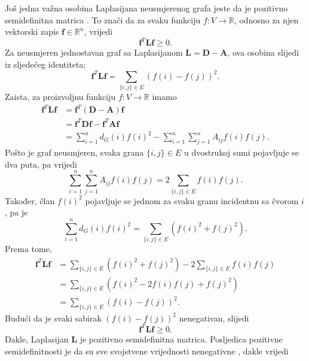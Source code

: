 Još jedna važna osobina Laplasijana neusmjerenog grafa jeste da je pozitivno semidefinitna matrica  \cite{chung1997spectral}. To znači da za svaku funkciju \(f:V\to\mathbb{R}\), odnosno za njen vektorski zapis \(\mathbf{f}\in\mathbb{R}^{n}\), vrijedi
\begin{equation}
    \mathbf{f}^{T}\mathbf{L}\mathbf{f} \geq 0.
\end{equation}
Za neusmjeren jednostavan graf sa Laplasijanom \(\mathbf{L}=\mathbf{D}-\mathbf{A}\), ova osobina slijedi iz sljedećeg identiteta:
\begin{equation}\label{laplasijan:kvadratna-forma-identitet}
    \mathbf{f}^{T}\mathbf{L}\mathbf{f}
    =
    \sum_{\{i,j\}\in E}(f(i)-f(j))^2.
\end{equation}
Zaista, za proizvoljnu funkciju \(f:V\to\mathbb{R}\) imamo
\begin{align}
\mathbf{f}^{T}\mathbf{L}\mathbf{f}
&= \mathbf{f}^{T}(\mathbf{D}-\mathbf{A})\mathbf{f} \\
&= \mathbf{f}^{T}\mathbf{D}\mathbf{f} - \mathbf{f}^{T}\mathbf{A}\mathbf{f} \\
&= \sum_{i=1}^{n} d_G(i)f(i)^2 - \sum_{i=1}^{n}\sum_{j=1}^{n} A_{ij}f(i)f(j).
\end{align}
Pošto je graf neusmjeren, svaka grana \(\{i,j\}\in E\) u dvostrukoj sumi pojavljuje se dva puta, pa vrijedi
\begin{equation}
    \sum_{i=1}^{n}\sum_{j=1}^{n} A_{ij}f(i)f(j)
    =
    2\sum_{\{i,j\}\in E} f(i)f(j).
\end{equation}
Također, član \(f(i)^2\) pojavljuje se jednom za svaku granu incidentnu sa čvorom \(i\), pa je
\begin{equation}
    \sum_{i=1}^{n} d_G(i)f(i)^2
    =
    \sum_{\{i,j\}\in E} \left(f(i)^2+f(j)^2\right).
\end{equation}
Prema tome,
\begin{align}
\mathbf{f}^{T}\mathbf{L}\mathbf{f}
&= \sum_{\{i,j\}\in E} \left(f(i)^2+f(j)^2\right)
   - 2\sum_{\{i,j\}\in E} f(i)f(j) \\
&= \sum_{\{i,j\}\in E} \left(f(i)^2 - 2f(i)f(j) + f(j)^2\right) \\
&= \sum_{\{i,j\}\in E}(f(i)-f(j))^2.
\end{align}
Budući da je svaki sabirak \((f(i)-f(j))^2\) nenegativan, slijedi
\begin{equation}
    \mathbf{f}^{T}\mathbf{L}\mathbf{f} \geq 0.
\end{equation}
Dakle, Laplasijan \(\mathbf{L}\) je pozitivno semidefinitna matrica. Posljedica pozitivne semidefinitnosti je da su sve svojstvene vrijednosti nenegativne \cite{chung1997spectral}, dakle vrijedi 

